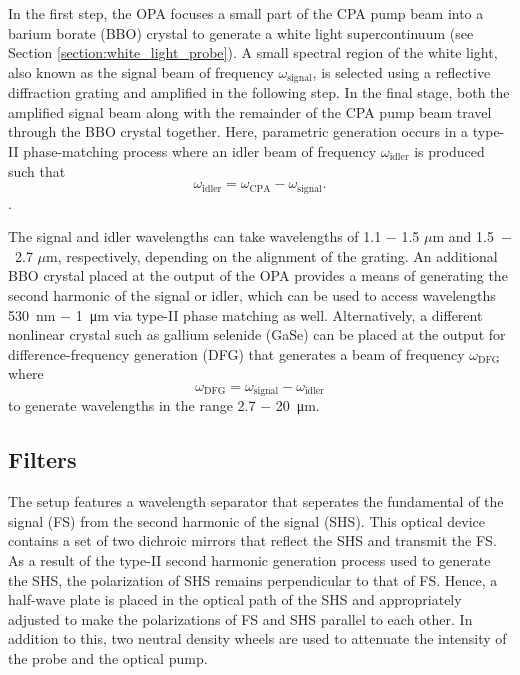 In the first step, the OPA focuses a small part of the CPA pump beam into a barium borate (BBO) crystal to generate a white light supercontinuum (see Section \ref{section:white_light_probe}). A small spectral region of the white light, also known as the signal beam of frequency $\omega_\text{signal}$, is selected using a reflective diffraction grating and amplified in the following step. In the final stage, both the amplified signal beam along with the remainder of the CPA pump beam travel through the BBO crystal together. Here, parametric generation occurs in a type-II phase-matching process where an idler beam of frequency $\omega_\text{idler}$ is produced such that
\begin{equation}
	\omega_\text{idler} = \omega_\text{CPA} - \omega_\text{signal}.
\end{equation}
\cite{dunn1999parametric, boyd2003nonlinear}.

The signal and idler wavelengths can take wavelengths of 1.1 $-$ 1.5 $\mu$m  and 1.5~$-$~2.7 $\mu$m, respectively, depending on the alignment of the grating. An additional BBO crystal placed at the output of the OPA provides a means of generating the second harmonic of the signal or idler, which can be used to access wavelengths \SI{530}{nm} $-$ \SI{1}{\micro \meter} via type-II phase matching as well. Alternatively, a different nonlinear crystal such as gallium selenide (GaSe) can be placed at the output for difference-frequency generation (DFG) that generates a beam of frequency $\omega_\text{DFG}$ where
\begin{equation}
	\omega_\text{DFG} = \omega_\text{signal} - \omega_\text{idler}
\end{equation}
to generate wavelengths in the range 2.7 $-$ \SI{20}{\micro\meter}.
\subsection{Filters}

The setup features a wavelength separator that seperates the fundamental of the signal (FS) from the second harmonic of the signal (SHS). This optical device contains a set of two dichroic mirrors that reflect the SHS and transmit the FS. As a result of the type-II second harmonic generation process used to generate the SHS, the polarization of SHS remains perpendicular to that of FS. Hence, a half-wave plate is placed in the optical path of the SHS and appropriately adjusted to make the polarizations of FS and SHS parallel to each other. In addition to this, two neutral density wheels are used to attenuate the intensity of the probe and the optical pump.

